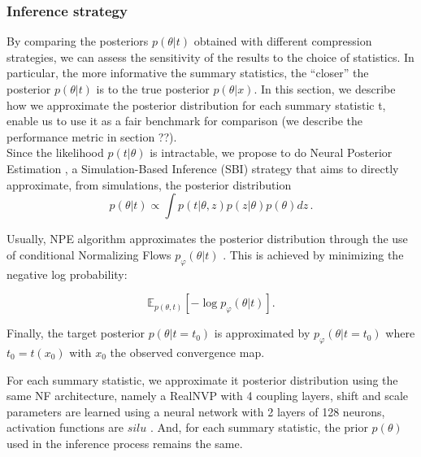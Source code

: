 \documentclass{aa}
\begin{document}
\subsubsection{Inference strategy}\label{Sec:Inference_strategy}
By comparing the posteriors $p(\theta| t)$ obtained with different compression strategies, we can assess the sensitivity of the results to the choice of statistics. In particular, the more informative the summary statistics, the “closer” the posterior $p(\theta | t)$ is to the true posterior $p(\theta | x)$. In this section, we describe how we approximate the posterior distribution for each summary statistic t, enable us to use it as a fair benchmark for comparison (we describe the performance metric in section ??).\\
Since the likelihood $p(t|\theta)$ is intractable, we propose to do Neural Posterior Estimation \citep{npe1, npe2, npe3}, a Simulation-Based Inference (SBI) strategy that aims to directly approximate, from simulations, the posterior distribution 
\begin{equation}
    p(\theta | t) \propto \int p(t | \theta, z) p(z|\theta) p(\theta) dz\,.
\end{equation}

Usually, NPE algorithm approximates the posterior distribution through the use of conditional Normalizing Flows $p_{\varphi} (\theta | t)$ \citep{nf1, nf2}. This is achieved by minimizing the negative log probability: 

\begin{equation}
    \mathbb{E}_{p(\theta, t)} \left[ - \log p_{\varphi} (\theta | t)  \right].
    \label{eq:nll}
\end{equation}

Finally, the target posterior $p(\theta | t = t_0)$ is approximated by $p_{\varphi}(\theta | t = t_0)$ where $t_0 = t(x_0)$ with $x_0$ the observed convergence map.

For each summary statistic, we approximate it posterior distribution using the same NF architecture, namely a RealNVP \citep{realnvp} with 4 coupling layers, shift and scale parameters are learned using a neural network with 2 layers of 128 neurons, activation functions are $silu$ \citep{silu}. And, for each summary statistic, the prior $p(\theta)$ used in the inference process remains the same.
\end{document}
